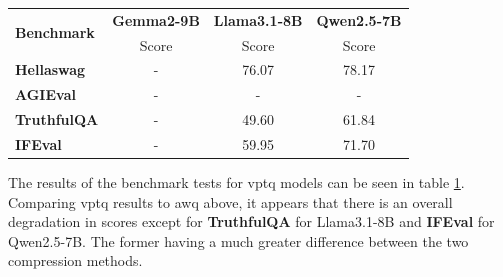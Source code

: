 \documentclass{ifacconf}
\begin{document}
    \begin{table}[H]
        \centering
        \begin{tabular}{|l|c|c|c|}
            \hline
            \multirow{2}{*}{\textbf{Benchmark}} & \textbf{Gemma2-9B} & \textbf{Llama3.1-8B} & \textbf{Qwen2.5-7B} \\ \cline{2-4}
                                                & Score    & Score      & Score      \\ \hline
            \textbf{Hellaswag}                & -            & 76.07              & 78.17              \\ \hline
            \textbf{AGIEval}                  & -            & -              & -              \\ \hline
            \textbf{TruthfulQA}               & -            & 49.60              & 61.84              \\ \hline
            \textbf{IFEval}                   & -            & 59.95              & 71.70              \\ \hline
        \end{tabular}
        \label{tab:vptq_results}
    \end{table}

    The results of the benchmark tests for \gls{vptq} models can be seen in table \ref{tab:vptq_results}. Comparing \gls{vptq} results to \gls{awq} above, it appears that there is an overall degradation in scores except for \textbf{TruthfulQA} for Llama3.1-8B and \textbf{IFEval} for Qwen2.5-7B. The former having a much greater difference between the two compression methods.
    \newpage
\end{document}
